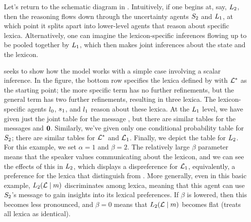 \documentclass[12pt,twoside]{article}
\renewcommand{\_}{\textbf{\textunderscore\hspace{-4pt}\textunderscore\hspace{-3pt}\textunderscore\hspace{-4pt}\textunderscore}\hspace{0.5pt}}			%
\begin{document}
Let's return to the schematic diagram in
. Intuitively, if one begins at, say,
$\ListenerK[2]$, then the reasoning flows down through the uncertainty
agents $\SpeakerK[2]$ and $\ListenerK[1]$, at which point it splits
apart into lower-level agents that reason about specific lexica.
Alternatively, one can imagine the lexicon-specific inferences flowing
up to be pooled together by $\ListenerK[1]$, which then makes joint
inferences about the state and the lexicon.

 seeks to show how the model works with a
simple case involving a scalar inference. In the figure, the bottom
row specifies the lexica defined by  with
$\LexStar$ as the starting point; the more specific term has no
further refinements, but the general term has two further refinements,
resulting in three lexica. The lexicon-specific agents
$\listenerZero$, $\speakerOne$, and $\listenerOne$ reason about these
lexica. At the $\ListenerK[1]$ level, we have given just the joint
table for the message , but there are similar tables for
the messages  and $\nullmsg$. Similarly, we've given only
one conditional probability table for $\SpeakerK[2]$; there are
similar tables for $\LexStar$ and $\Lex_{1}$. Finally, we depict the
 table for $\ListenerK[2]$. For this example, we set
$\alpha = 1$ and $\beta = 2$. The relatively large $\beta$ parameter
means that the speaker values communicating about the lexicon, and we
can see the effects of this in $\ListenerK[2]$, which displays a
dispreference for $\Lex_{1}$, equivalently, a preference for the
lexica that distinguish  from . More generally,
even in this basic example, $\ListenerK[2](\Lex\given\msg)$
discriminates among lexica, meaning that this agent can use
$\SpeakerK[2]$'s message to gain insights into its lexical
preferences. If $\beta$ is lowered, then this becomes less pronounced,
and $\beta = 0$ means that $\ListenerK[2](\Lex\given\msg)$ becomes
flat (treats all lexica as identical).
\end{document}
